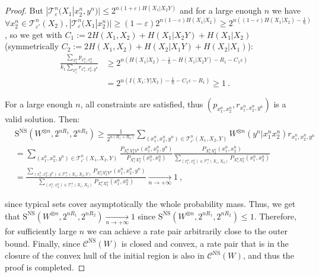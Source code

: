 \begin{proof}
     But $|\mathcal{T}^n_{\varepsilon}(X_1|x_2^n,y^n)| \leq 2^{n(1+\varepsilon)H(X_1|X_2Y)}$ and for a large enough $n$ we have $\forall x_2^n \in \mathcal{T}^n_{\varepsilon'}(X_2), |\mathcal{T}^n_{\varepsilon}(X_1|x_2^n)| \geq (1-\varepsilon)2^{n(1-\varepsilon)H(X_1|X_2)} \geq 2^{n\left((1-\varepsilon)H(X_1|X_2)-\frac{1}{n}\right)}$, so we get with $C_1 := 2 H(X_1,X_2) + H(X_1|X_2Y) + H(X_1|X_2)$ (symmetrically $C_2 := 2 H(X_1,X_2) + H(X_2|X_1Y) + H(X_2|X_1)$):
     \begin{equation}
       \begin{aligned}
         \frac{\sum_{x_1^n} p_{x_1^n,x_2^n}}{k_1\sum_{x_1^n} r_{x_1^n,x_2^n,y^n}} &\geq 2^{n\left(H(X_1|X_2) - \frac{1}{n} -H(X_1|X_2Y)-R_1-C_1\varepsilon\right)}\\
         &= 2^{n\left(I(X_1: Y | X_2)-\frac{1}{n}-C_1\varepsilon-R_1\right)} \geq 1 \ .
      \end{aligned}
    \end{equation}         
     
    For a large enough $n$, all constraints are satisfied, thus $(p_{x_1^n,x_2^n},r_{x_1^n,x_2^n,y^n})$ is a valid solution. Then:
    \begin{equation}
      \begin{aligned}
        &\mathrm{S}^{\overline{\mathrm{NS}}}(W^{\otimes n},2^{nR_1},2^{nR_2}) \geq \frac{1}{2^{n(R_1+R_2)}} \sum_{(x_1^n,x_2^n,y^n) \in \mathcal{T}^n_{\varepsilon'}(X_1,X_2,Y)} W^{\otimes n}(y^n|x_1^nx_2^n)r_{x_1^n,x_2^n,y^n}\\
        &= \sum_{(x_1^n,x_2^n,y^n) \in \mathcal{T}^n_{\varepsilon'}(X_1,X_2,Y)} \frac{P_{X_1^nX_2^nY^n}(x_1^n,x_2^n,y^n)}{P_{X_1^nX_2^n}(x_1^n,x_2^n)}\frac{P_{X_1^nX_2^n}(x_1^n,x_2^n)}{\sum_{(x_1^n,x_2^n) \in \mathcal{T}^n_{\varepsilon}(X_1,X_2)}P_{X_1^nX_2^n}(x_1^n,x_2^n)}\\
        &= \frac{\sum_{(x_1^n,x_2^n,y^n) \in \mathcal{T}^n_{\varepsilon'}(X_1,X_2,Y)} P_{X_1^nX_2^nY^n}(x_1^n,x_2^n,y^n)}{\sum_{(x_1^n,x_2^n) \in \mathcal{T}^n_{\varepsilon}(X_1,X_2)}P_{X_1^nX_2^n}(x_1^n,x_2^n) } \underset{n \rightarrow +\infty}{\rightarrow} 1\ ,
      \end{aligned}
    \end{equation}

    since typical sets cover asymptotically the whole probability mass. Thus, we get that $\mathrm{S}^{\overline{\mathrm{NS}}}(W^{\otimes n},2^{nR_1},2^{nR_2}) \underset{n \rightarrow +\infty}{\rightarrow} 1$ since $\mathrm{S}^{\overline{\mathrm{NS}}}(W^{\otimes n},2^{nR_1},2^{nR_2}) \leq 1$. Therefore, for sufficiently large $n$ we can achieve a rate pair arbitrarily close to the outer bound. Finally, since $\mathcal{C}^{\overline{\mathrm{NS}}}(W)$ is closed and convex, a rate pair that is in the closure of the convex hull of the initial region is also in $\mathcal{C}^{\overline{\mathrm{NS}}}(W)$, and thus the proof is completed.
  \end{proof}


